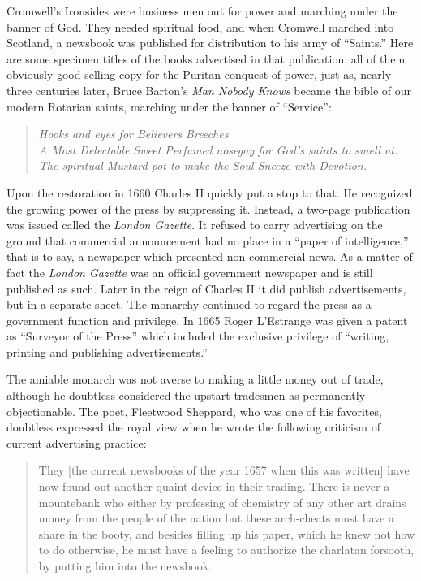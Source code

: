 \documentclass[nohyper,openany,nobib]{tufte-book}
\begin{document}
Cromwell's Ironsides were business men out for power and marching under
the banner of God. They needed spiritual food, and when Cromwell marched
into Scotland, a newsbook was published for distribution to his army of
``Saints.'' Here are some specimen titles of the books advertised in
that publication, all of them obviously good selling copy for the
Puritan conquest of power, just as, nearly three centuries later, Bruce
Barton's \emph{Man Nobody Knows} became the bible of our modern Rotarian
saints, marching under the banner of ``Service'':

\begin{quote}
\emph{Hooks and eyes for Believers Breeches}\\
\emph{A Most Delectable Sweet Perfumed nosegay for God's saints to smell
at.}\\
\emph{The spiritual Mustard pot to make the Soul Sneeze with Devotion.}
\end{quote}

Upon the restoration in 1660 Charles II quickly put a stop to that. He
recognized the growing power of the press by suppressing it. Instead, a
two-page publication was issued called the \emph{London Gazette}. It
refused to carry advertising on the ground that commercial announcement
had no place in a ``paper of intelligence,'' that is to say, a newspaper
which presented non-commercial news. As a matter of fact the
\emph{London Gazette} was an official government newspaper and is still
published as such. Later in the reign of Charles II it did publish
advertisements, but in a separate sheet. The monarchy continued to
regard the press as a government function and privilege. In 1665 Roger
L'Estrange was given a patent as ``Surveyor of the Press'' which
included the exclusive privilege of ``writing, printing and publishing
advertisements.''

The amiable monarch was not averse to making a little money out of
trade, although he doubtless considered the upstart tradesmen as
permanently objectionable. The poet, Fleetwood Sheppard, who was one of
his favorites, doubtless expressed the royal view when he wrote the
following criticism of current advertising practice:

\begin{quote}
They {[}the current newsbooks of the year 1657 when this was written{]}
have now found out another quaint device in their trading. There is
never a mountebank who either by professing of chemistry of any other
art drains money from the people of the nation but these arch-cheats
must have a share in the booty, and besides filling up his paper, which
he knew not how to do otherwise, he must have a feeling to authorize the
charlatan forsooth, by putting him into the newsbook.
\end{quote}
\end{document}
